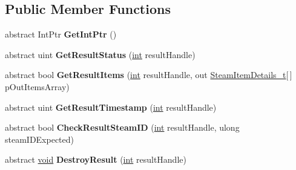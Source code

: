 \subsection*{Public Member Functions}
\begin{DoxyCompactItemize}
\item 
\hypertarget{classValve_1_1Steamworks_1_1ISteamInventory_a945c0ad486580f85db879b8d16079bdc}{}abstract Int\+Ptr {\bfseries Get\+Int\+Ptr} ()\label{classValve_1_1Steamworks_1_1ISteamInventory_a945c0ad486580f85db879b8d16079bdc}

\item 
\hypertarget{classValve_1_1Steamworks_1_1ISteamInventory_a7f9e72b9a89e2837586905c84e01835c}{}abstract uint {\bfseries Get\+Result\+Status} (\hyperlink{SDL__thread_8h_a6a64f9be4433e4de6e2f2f548cf3c08e}{int} result\+Handle)\label{classValve_1_1Steamworks_1_1ISteamInventory_a7f9e72b9a89e2837586905c84e01835c}

\item 
\hypertarget{classValve_1_1Steamworks_1_1ISteamInventory_ab7afe612ae7df5f31c54952e27fb589d}{}abstract bool {\bfseries Get\+Result\+Items} (\hyperlink{SDL__thread_8h_a6a64f9be4433e4de6e2f2f548cf3c08e}{int} result\+Handle, out \hyperlink{structValve_1_1Steamworks_1_1SteamItemDetails__t}{Steam\+Item\+Details\+\_\+t}\mbox{[}$\,$\mbox{]} p\+Out\+Items\+Array)\label{classValve_1_1Steamworks_1_1ISteamInventory_ab7afe612ae7df5f31c54952e27fb589d}

\item 
\hypertarget{classValve_1_1Steamworks_1_1ISteamInventory_a3a049b0eed5bc583c6ae781e8ec675e2}{}abstract uint {\bfseries Get\+Result\+Timestamp} (\hyperlink{SDL__thread_8h_a6a64f9be4433e4de6e2f2f548cf3c08e}{int} result\+Handle)\label{classValve_1_1Steamworks_1_1ISteamInventory_a3a049b0eed5bc583c6ae781e8ec675e2}

\item 
\hypertarget{classValve_1_1Steamworks_1_1ISteamInventory_a8628cff2db1fe3ef51c90e3b8164e4a8}{}abstract bool {\bfseries Check\+Result\+Steam\+I\+D} (\hyperlink{SDL__thread_8h_a6a64f9be4433e4de6e2f2f548cf3c08e}{int} result\+Handle, ulong steam\+I\+D\+Expected)\label{classValve_1_1Steamworks_1_1ISteamInventory_a8628cff2db1fe3ef51c90e3b8164e4a8}

\item 
\hypertarget{classValve_1_1Steamworks_1_1ISteamInventory_a1b119a6fe54631f08f5e7b19444274e9}{}abstract \hyperlink{SDL__audio_8h_a52835ae37c4bb905b903cbaf5d04b05f}{void} {\bfseries Destroy\+Result} (\hyperlink{SDL__thread_8h_a6a64f9be4433e4de6e2f2f548cf3c08e}{int} result\+Handle)\label{classValve_1_1Steamworks_1_1ISteamInventory_a1b119a6fe54631f08f5e7b19444274e9}


\end{DoxyCompactItemize}
